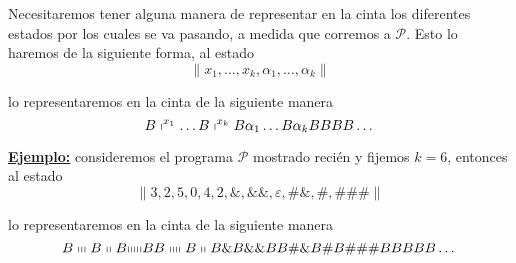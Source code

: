 \begin{frame}
	\PN Necesitaremos tener alguna manera de representar en la cinta los diferentes estados por los cuales se va pasando,
	a medida que corremos a $\mathcal{P}$. Esto lo haremos de la siguiente forma, al estado
	\begin{equation*}
		\lVert x_{1}, \dotsc, x_{k}, \alpha_{1}, \dotsc, \alpha_{k} \rVert
	\end{equation*}

	\PN lo representaremos en la cinta de la siguiente manera
	\begin{equation*}
		B \shortmid^{x_{1}} \dotsc B \shortmid^{x_{k}} B \alpha_{1} \dotsc B \alpha_{k} BBBB \dotsc
	\end{equation*}

	\PN \underline{\textbf{Ejemplo:}} consideremos el programa $\mathcal{P}$ mostrado recién y fijemos $k=6$, entonces al
	estado
	\begin{equation*}
		\lVert 3, 2, 5, 0, 4, 2, \&, \&\&, \varepsilon, \#\&, \#, \#\#\# \rVert
	\end{equation*}

	\PN lo representaremos en la cinta de la siguiente manera
	\begin{equation*}
		B \shortmid \shortmid \shortmid B \shortmid \shortmid B\mathrm{\shortmid \shortmid \shortmid \shortmid \shortmid}
		BB \shortmid \shortmid \shortmid \shortmid B \shortmid \shortmid B \& B \&\& BB \#\& B \# B \#\#\# BBBBB \dotsc
	\end{equation*}
\end{frame}
